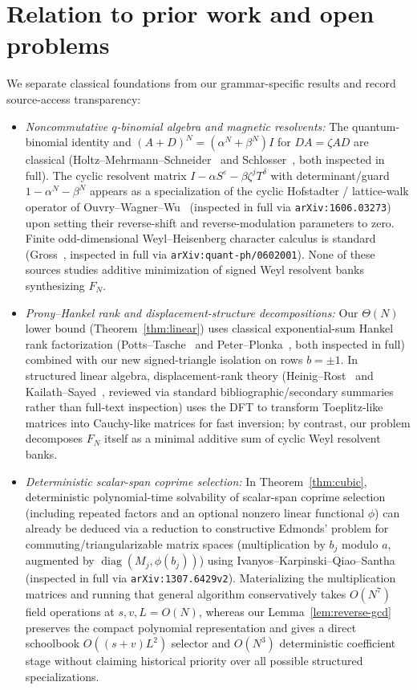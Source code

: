 \documentclass[11pt,reqno]{amsart}
\numberwithin{equation}{section}
\theoremstyle{definition}
\theoremstyle{remark}
\newcommand{\eps}{\varepsilon}
\begin{document}
\section{Relation to prior work and open problems}
\label{sec:prior}

We separate classical foundations from our grammar-specific results and record source-access transparency:
\begin{itemize}[leftmargin=1.5em]
\item \emph{Noncommutative $q$-binomial algebra and magnetic resolvents:} The quantum-binomial identity and $(A+D)^N=(\alpha^N+\beta^N)I$ for $DA=\zeta AD$ are classical (Holtz--Mehrmann--Schneider~\cite[Theorems~1--2]{HMS04} and Schlosser~\cite[Proposition~1]{Sch12}, both inspected in full). The cyclic resolvent matrix $I-\alpha S^\eps - \beta\zeta^j T^\delta$ with determinant/guard $1-\alpha^N-\beta^N$ appears as a specialization of the cyclic Hofstadter / lattice-walk operator of Ouvry--Wagner--Wu~\cite[Section~2.2, Eqs.~(7)--(8)]{OWW16} (inspected in full via \texttt{arXiv:1606.03273}) upon setting their reverse-shift and reverse-modulation parameters to zero. Finite odd-dimensional Weyl--Heisenberg character calculus is standard (Gross~\cite[Section~II.A--D]{Gro06}, inspected in full via \texttt{arXiv:quant-ph/0602001}). None of these sources studies additive minimization of signed Weyl resolvent banks synthesizing $F_N$.
\item \emph{Prony--Hankel rank and displacement-structure decompositions:} Our $\Theta(N)$ lower bound (Theorem~\ref{thm:linear}) uses classical exponential-sum Hankel rank factorization (Potts--Tasche~\cite[Section~2]{PT10} and Peter--Plonka~\cite[Theorem~2.1]{PP13}, both inspected in full) combined with our new signed-triangle isolation on rows $b=\pm 1$. In structured linear algebra, displacement-rank theory (Heinig--Rost~\cite{HR84} and Kailath--Sayed~\cite{KS95}, reviewed via standard bibliographic/secondary summaries rather than full-text inspection) uses the DFT to transform Toeplitz-like matrices into Cauchy-like matrices for fast inversion; by contrast, our problem decomposes $F_N$ itself as a minimal additive sum of cyclic Weyl resolvent banks.
\item \emph{Deterministic scalar-span coprime selection:} In Theorem~\ref{thm:cubic}, deterministic polynomial-time solvability of scalar-span coprime selection (including repeated factors and an optional nonzero linear functional $\phi$) can already be deduced via a reduction to constructive Edmonds' problem for commuting/triangularizable matrix spaces (multiplication by $b_j$ modulo $a$, augmented by $\operatorname{diag}(M_j,\phi(b_j))$) using Ivanyos--Karpinski--Qiao--Santha~\cite[Theorem~2 and Section~5.2, Algorithm~1]{IKQS15} (inspected in full via \texttt{arXiv:1307.6429v2}). Materializing the multiplication matrices and running that general algorithm conservatively takes $O(N^7)$ field operations at $s,v,L=O(N)$, whereas our Lemma~\ref{lem:reverse-gcd} preserves the compact polynomial representation and gives a direct schoolbook $O((s+v)L^2)$ selector and $O(N^3)$ deterministic coefficient stage without claiming historical priority over all possible structured specializations.
\end{itemize}
\end{document}
